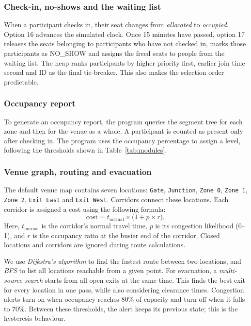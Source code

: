 \documentclass[11pt,a4paper]{article}
\newcommand{\code}[1]{\texttt{#1}}
\begin{document}
\subsubsection*{Check-in, no-shows and the waiting list}
When a participant checks in, their seat changes from \emph{allocated} to
\emph{occupied}. Option 16 advances the simulated clock. Once 15 minutes have
passed, option 17 releases the seats belonging to participants who have not
checked in, marks those participants as NO\_SHOW and assigns the freed seats to
people from the waiting list. The heap ranks participants by higher priority
first, earlier join time second and ID as the final tie-breaker. This also makes
the selection order predictable.

\subsubsection*{Occupancy report}
To generate an occupancy report, the program queries the segment tree for
each zone and then for the venue as a whole. A participant is counted as present
only after checking in. The program uses the occupancy percentage to assign a
level, following the thresholds shown in Table~\ref{tab:modules}.

\subsubsection*{Venue graph, routing and evacuation}
The default venue map contains seven locations: \code{Gate}, \code{Junction},
\code{Zone 0}, \code{Zone 1}, \code{Zone 2}, \code{Exit East} and
\code{Exit West}. Corridors connect these locations. Each corridor is assigned
a cost using the following formula:
\[
  \text{cost} = t_{\text{normal}} \times \bigl(1 + p \times r\bigr),
\]
Here, $t_{\text{normal}}$ is the corridor's normal travel time, $p$ is its
congestion likelihood (0--1), and $r$ is the occupancy ratio at the busier end
of the corridor. Closed locations and corridors are ignored during route
calculations.

We use \emph{Dijkstra's algorithm} to find the fastest route between two
locations, and \emph{BFS} to list all locations reachable from a given point.
For evacuation, a \emph{multi-source search} starts from all open exits at the
same time. This finds the best exit for every location in one pass, while also
considering clearance times. Congestion alerts turn on when occupancy reaches
80\% of capacity and turn off when it falls to 70\%. Between these thresholds,
the alert keeps its previous state; this is the hysteresis behaviour.
\end{document}
